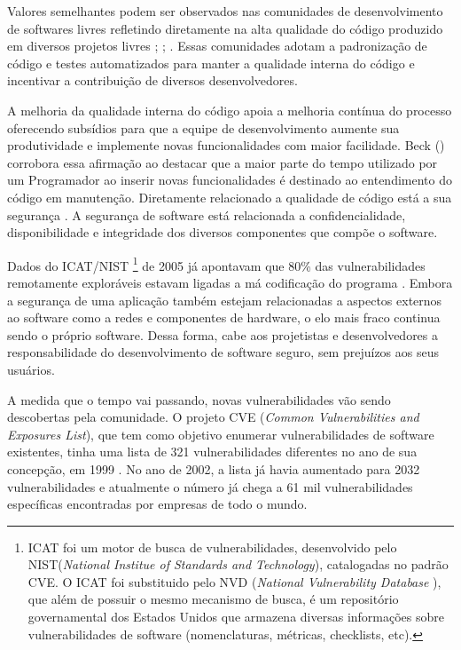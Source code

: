 Valores semelhantes podem ser observados nas comunidades de desenvolvimento de softwares livres refletindo diretamente na alta qualidade do código produzido em diversos projetos livres \cite{schmidt2001}; \cite{halloran2002}; \cite{michlmayr2003}.
%
Essas comunidades adotam a padronização de código e testes automatizados para manter a qualidade interna do código e incentivar a contribuição de diversos desenvolvedores.

A melhoria da qualidade interna do código apoia a melhoria contínua do processo oferecendo subsídios para que a equipe de desenvolvimento aumente sua produtividade e implemente novas funcionalidades com maior facilidade. Beck (\citeyear{beck2007}) corrobora essa afirmação ao destacar que a maior parte do tempo utilizado por um Programador ao inserir novas funcionalidades é destinado ao entendimento do código em manutenção. 
%
Diretamente relacionado a qualidade de código está a sua segurança \cite{tsipenyuk2005}. A segurança de software está relacionada a confidencialidade, disponibilidade e integridade dos diversos componentes que compõe o software.

Dados do ICAT/NIST
\footnote{ ICAT foi um motor de busca de vulnerabilidades, desenvolvido pelo NIST(\emph{National Institue of Standards and Technology}), catalogadas no padrão CVE. O ICAT foi substituido pelo NVD (\emph{National Vulnerability Database }), que além de possuir o mesmo mecanismo de busca, é um repositório governamental dos Estados Unidos que armazena diversas informações sobre vulnerabilidades de software (nomenclaturas, métricas, checklists, etc).} de 2005 já apontavam que 80\% das vulnerabilidades remotamente exploráveis estavam ligadas a má codificação do programa \cite{duarte2005}.
%
Embora a segurança de uma aplicação também estejam relacionadas a aspectos externos ao software como a redes e componentes de hardware, o elo mais fraco continua sendo o próprio software. Dessa forma, cabe aos projetistas e desenvolvedores a responsabilidade do desenvolvimento de software seguro, sem prejuízos aos seus usuários.

%

A medida que o tempo vai passando, novas vulnerabilidades vão sendo descobertas pela comunidade. O projeto CVE (\emph{Common Vulnerabilities and Exposures List}), que tem como objetivo enumerar vulnerabilidades de software existentes, tinha uma lista de 321 vulnerabilidades diferentes no ano de sua concepção, em 1999 \cite{cve2002}.
%
No ano de 2002, a lista já havia aumentado para 2032 vulnerabilidades e atualmente o número já chega a 61 mil vulnerabilidades específicas encontradas por empresas de todo o mundo.



